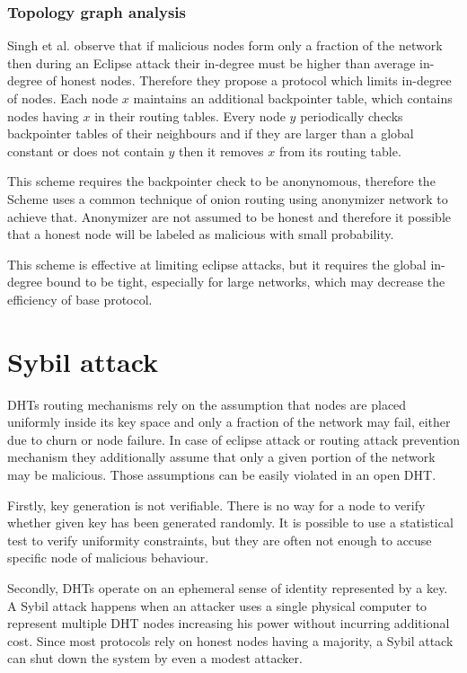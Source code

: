  \subsubsection{Topology graph analysis}
  Singh et al. \cite[p. 23]{urd11} observe that if malicious nodes form only a
  fraction of the network then during an Eclipse attack their in-degree must be
  higher than average in-degree of honest nodes. Therefore they propose a
  protocol which limits in-degree of nodes. Each node $x$ maintains an
  additional backpointer table, which contains nodes having $x$ in their routing
  tables. Every node $y$ periodically checks backpointer tables of their
  neighbours and if they are larger than a global constant or does not contain
  $y$ then it removes $x$ from its routing table.

  This scheme requires the backpointer check to be anonynomous, therefore the
  Scheme uses a common technique of onion routing using anonymizer network to
  achieve that. Anonymizer are not assumed to be honest and therefore it
  possible that a honest node will be labeled as malicious with small
  probability.

  This scheme is effective at limiting eclipse attacks, but it requires the
  global in-degree bound to be tight, especially for large networks, which may
  decrease the efficiency of base protocol.

\section{Sybil attack}
  DHTs routing mechanisms rely on the assumption that nodes are placed uniformly
  inside its key space and only a fraction of the network may fail, either due
  to churn or node failure. In case of eclipse attack or routing attack
  prevention mechanism they additionally assume that only a given portion of the
  network may be malicious. Those assumptions can be easily violated in an open
  DHT.

  Firstly, key generation is not verifiable. There is no way for a node to
  verify whether given key has been generated randomly. It is possible to use a
  statistical test to verify uniformity constraints, but they are often not
  enough to accuse specific node of malicious behaviour.

  Secondly, DHTs operate on an ephemeral sense of identity represented by a key.
  A Sybil attack happens when an attacker uses a single physical computer to
  represent multiple DHT nodes increasing his power without incurring additional
  cost. Since most protocols rely on honest nodes having a majority, a Sybil
  attack can shut down the system by even a modest attacker.

